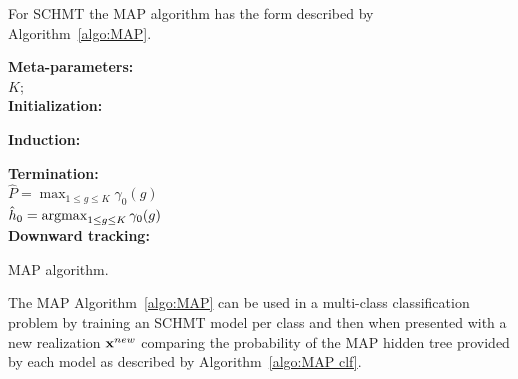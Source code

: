 \documentclass[a4paper,11pt]{report}
\begin{document}
    For SCHMT the MAP algorithm has the form described by Algorithm~\ref{algo:MAP}.
    
		\begin{center}
			\begin{algorithm}
				\textbf{Meta-parameters:}\\
					$K$;\\
					
				\textbf{Initialization:}\\
					
				\textbf{Induction:}\\
				
				\textbf{Termination:}\\
					$\hat{P} = \max_{1\leq g \leq K} \gamma_{0}(g)$\\
					$\hat{h}_{0} = \mathop{\rm argmax}_{1\leq g \leq K} \gamma_{0}(g)$\\
				
				\textbf{Downward tracking:}\\
				
				\caption{MAP algorithm.}
				\label{algo:MAP}
			\end{algorithm}        
		\end{center}
		
		The MAP Algorithm~\ref{algo:MAP} can be used in a multi-class classification problem by training an SCHMT model per class and then when presented with a new realization ${\bf x}^{new}$ comparing the probability of the MAP hidden tree provided by each model as described by Algorithm~\ref{algo:MAP clf}.
		
\end{document}
